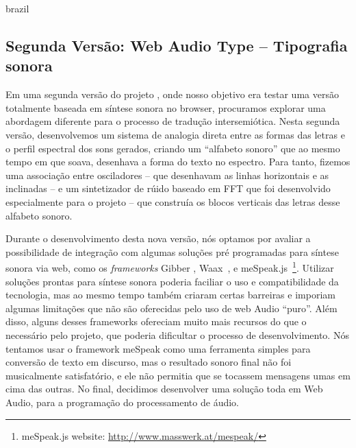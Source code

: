 \begin{otherlanguage*}{brazil}
\subsection{Segunda Versão: Web Audio Type -- Tipografia sonora}
Em uma segunda versão do projeto \cite{Stolfi2017w}, onde nosso objetivo era testar uma versão totalmente baseada em síntese sonora no browser, procuramos explorar uma abordagem diferente para o processo de tradução intersemiótica. Nesta segunda versão, desenvolvemos um sistema de analogia direta entre as formas das letras e o perfil espectral dos sons gerados, criando um ``alfabeto sonoro'' que ao mesmo tempo em que soava, desenhava a forma do texto no espectro. Para tanto, fizemos uma associação entre osciladores -- que desenhavam as linhas horizontais e as inclinadas -- e um sintetizador de rúido baseado em FFT que foi desenvolvido especialmente para o projeto -- que construía os blocos verticais das letras desse alfabeto sonoro.

Durante o desenvolvimento desta nova versão, nós optamos por avaliar a possibilidade de integração com algumas soluções pré programadas para síntese sonora via web, como os \emph{frameworks} Gibber \cite{Roberts2012gibberlivecoding}, Waax~\cite{Choi2013waax}, e meSpeak.js~\footnote{meSpeak.js website: \url{http://www.masswerk.at/mespeak/}}. Utilizar soluções prontas para síntese sonora poderia faciliar o uso e compatibilidade da tecnologia, mas ao mesmo tempo também criaram certas barreiras e imporiam algumas limitações que não são oferecidas pelo uso de web Audio ``puro''. Além disso, alguns desses frameworks ofereciam muito mais recursos do que o necessário pelo projeto, que poderia dificultar o processo de desenvolvimento. Nós tentamos usar o framework meSpeak como uma ferramenta simples para conversão de texto em discurso, mas o resultado sonoro final não foi musicalmente satisfatório, e ele não permitia que se tocassem mensagens umas em cima das outras. No final, decidimos desenvolver uma solução toda em Web Audio, para a programação do processamento de áudio.




\end{otherlanguage*}
